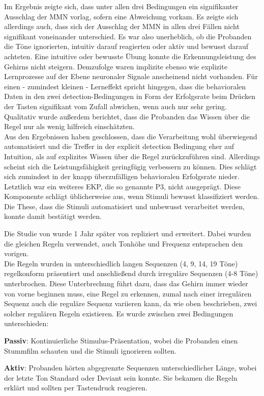 \documentclass[doc,a4paper,12pt]{apa6}
\begin{document}
Im Ergebnis zeigte sich, dass unter allen drei Bedingungen ein signifikanter Ausschlag der MMN vorlag, sofern eine Abweichung vorkam. Es zeigte sich allerdings auch, dass sich der Ausschlag der MMN in allen drei Fällen nicht signifikant voneinander unterschied. Es war also unerheblich, ob die Probanden die Töne ignorierten, intuitiv darauf reagierten oder aktiv und bewusst darauf achteten. Eine intuitive oder bewusste Übung konnte die Erkennungsleistung des Gehirns nicht steigern. Demzufolge waren implizite ebenso wie explizite Lernprozesse auf der Ebene neuronaler Signale anscheinend nicht vorhanden. Für einen - zumindest kleinen - Lerneffekt spricht hingegen, dass die behavioralen Daten in den zwei detection-Bedingungen in Form der Erfolgsrate beim Drücken der Tasten signifikant vom Zufall abwichen, wenn auch nur sehr gering. Qualitativ wurde außerdem berichtet, dass die Probanden das Wissen über die Regel nur als wenig hilfreich einschätzten.\\
Aus den Ergebnissen haben \textcite{paavilainen2007preattentive} geschlossen, dass die Verarbeitung wohl überwiegend automatisiert und die Treffer in der explicit detection Bedingung eher auf Intuition, als auf explizites Wissen über die Regel zurückzuführen sind. Allerdings scheint sich die  Leistungsfähigkeit geringfügig verbessern zu können. Dies schlägt sich zumindest in der knapp überzufälligen behavioralen Erfolgsrate nieder. Letztlich war ein weiteres EKP, die so genannte P3, nicht ausgeprägt. Diese Komponente schlägt üblicherweise aus, wenn Stimuli bewusst klassifiziert werden. Die These, dass die Stimuli automatisiert und unbewusst verarbeitet werden, konnte damit bestätigt werden.

Die Studie von \textcite{paavilainen2007preattentive} wurde 1 Jahr später von \textcite{bendixen2008rapid} repliziert und erweitert. Dabei wurden die gleichen Regeln verwendet, auch Tonhöhe und Frequenz entsprachen den vorigen.\\
Die Regeln wurden in unterschiedlich langen Sequenzen (4, 9, 14, 19 Töne) regelkonform präsentiert und anschließend durch irreguläre Sequenzen (4-8 Töne) unterbrochen. Diese Unterbrechung führt dazu, dass das Gehirn immer wieder von vorne beginnen muss, eine Regel zu erkennen, zumal nach einer irregulären Sequenz auch die reguläre Sequenz variieren kann, da wie oben beschrieben, zwei solcher regulären Regeln existieren. Es wurde zwischen zwei Bedingungen unterschieden:

\begin{compactitem}
  \item \textbf{Passiv}: Kontinuierliche Stimulus-Präsentation, wobei die Probanden einen Stummfilm schauten und die Stimuli ignorieren sollten.
  \item \textbf{Aktiv}: Probanden hörten abgegrenzte Sequenzen unterschiedlicher Länge, wobei der letzte Ton Standard oder Deviant sein konnte. Sie bekamen die Regeln erklärt und sollten per Tastendruck reagieren.
\end{compactitem}
\end{document}
